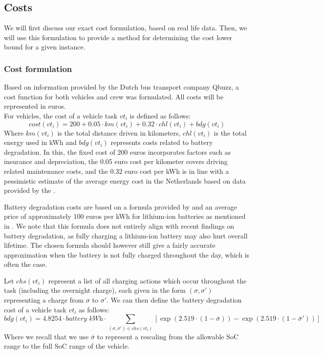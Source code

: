 \documentclass[]{article}
\begin{document}
\subsection{Costs} \label{sec:results-costs}
We will first discuss our exact cost formulation, based on real life data. Then, we will use this formulation to provide a method for determining the cost lower bound for a given instance. 

\subsubsection{Cost formulation}
Based on information provided by the Dutch bus transport company Qbuzz, a cost function for both vehicles and crew was formulated. All costs will be represented in euros. \\

\noindent For vehicles, the cost of a vehicle task $vt_i$ is defined as follows:
\begin{equation}
cost(vt_i) = 200 + 0.05 \cdot km(vt_i) + 0.32 \cdot chl(vt_i) + bdg(vt_i)  \nonumber
\end{equation}
Where $km(vt_i)$ is the total distance driven in kilometers, $chl(vt_i)$ is the total energy used in kWh and $bdg(vt_i)$ represents costs related to battery degradation. In this, the fixed cost of 200 euros incorporates factors such as insurance and depreciation, the 0.05 euro cost per kilometer covers driving related maintenance costs, and the 0.32 euro cost per kWh is in line with a pessimistic estimate of the average energy cost in the Netherlands based on data provided by the \citet{ANWB2025}.

Battery degradation costs are based on a formula provided by \citet{vanKootenNiekerk2017} and an average price of approximately 100 euros per kWh for lithium-ion batteries as mentioned in \citet{Ocatsaros2024}. We note that this formula does not entirely align with recent findings on battery degradation, as fully charging a lithium-ion battery may also hurt overall lifetime. The chosen formula should however still give a fairly accurate approximation when the battery is not fully charged throughout the day, which is often the case. 

Let $chs(vt_i)$ represent a list of all charging actions which occur throughout the task (including the overnight charge), each given in the form $(\sigma, \sigma')$ representing a charge from $\sigma$ to $\sigma'$. We can then define the battery degradation cost of a vehicle task $vt_i$ as follows:
\begin{equation}
  bdg(vt_i) = 4.8254 \cdot \textit{battery kWh} \cdot \sum_{(\sigma, \sigma') \in chs(vt_i)} [\exp(2.519 \cdot (1 - \bar{\sigma})) - \exp(2.519 \cdot (1 - \bar{\sigma}'))] \nonumber
\end{equation}
Where we recall that we use $\bar{\sigma}$ to represent a rescaling from the allowable SoC range to the full SoC range of the vehicle. \\
\end{document}
